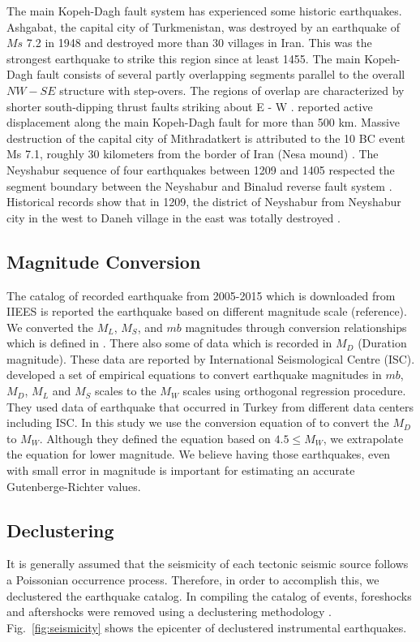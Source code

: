 The main Kopeh-Dagh fault system has experienced some historic earthquakes. Ashgabat, the capital city of Turkmenistan, was destroyed by an earthquake of $Ms$ 7.2 in 1948 and destroyed more than 30 villages in Iran. This was the strongest earthquake to strike this region since at least 1455.
The main Kopeh-Dagh fault consists of several partly overlapping segments parallel to the overall $NW - SE$ structure with step-overs. The regions of overlap are characterized by shorter south-dipping thrust faults striking about E - W \citep{Berberian2001}. \citet{Trifonov1978} reported active displacement along the main Kopeh-Dagh fault for more than 500 km. 
Massive destruction of the capital city of Mithradatkert is attributed to the 10 BC event Ms 7.1, roughly 30 kilometers from the border of Iran (Nesa mound) \citep{Berberian2001}.
The Neyshabur sequence of four earthquakes between 1209 and 1405 respected the segment boundary between the Neyshabur and Binalud reverse fault system \citep{Berberian1999}.
Historical records show that in 1209, the district of Neyshabur from Neyshabur city in the west to Daneh village in the east was totally destroyed \citep{Berberian1999}.

\subsection{Magnitude Conversion}
\noindent
The catalog of recorded earthquake from 2005-2015 which is downloaded from IIEES is reported the earthquake based on different magnitude scale (reference). We converted the $M_L$, $M_S$, and $mb$ magnitudes through conversion relationships which is defined in \citet{Zare2014}. There also some of data which is recorded in $M_D$ (Duration magnitude). These data are reported by International Seismological Centre (ISC).  \citet{Deniz2010} developed a set of empirical equations to convert earthquake magnitudes in $mb$, $M_D$, $M_L$ and $M_S$ scales to the $M_W$ scales using orthogonal regression procedure. They used data of earthquake that occurred in Turkey from different data centers including ISC. In this study we use the conversion equation of \citet{Deniz2010} to convert the $M_D$ to $M_W$. Although they defined the equation based on $4.5\leqslant M_W$, we extrapolate the equation for lower magnitude. We believe having those earthquakes, even with small error  in magnitude is important for estimating an accurate  Gutenberge-Richter values.

\subsection{Declustering}
\noindent
It is generally assumed that the seismicity of each tectonic seismic source follows a Poissonian occurrence process. Therefore, in order to accomplish this, we declustered the earthquake catalog. In compiling the catalog of events, foreshocks and aftershocks were removed using a declustering methodology \citet{Gardner1974}. Fig.~\ref{fig:seismicity} shows the epicenter of declustered instrumental  earthquakes.

